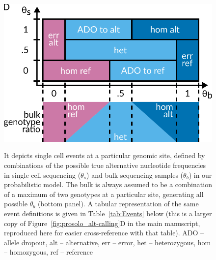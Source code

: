 \documentclass[authoryear,preprint,11pt]{scrartcl}
\begin{document}
\begin{figure}[tbp]
 \includegraphics[width=.7\linewidth]{figs/Event_space.pdf}\\
 \caption{
  It depicts single cell events at a particular genomic site, defined by combinations of the possible true alternative nucleotide frequencies in single cell sequencing ($\theta_s$) and bulk sequencing samples ($\theta_b$) in our probabilistic model.
  The bulk is always assumed to be a combination of a maximum of two genotypes at a particular site, generating all possible $\theta_b$ (bottom panel).
  A tabular representation of the same event definitions is given in Table~\ref{tab:Events} below (this is a larger copy of Figure~\ref{fig:prosolo_alt-calling}D in the main manuscript, reproduced  here for easier cross-reference with that table).\footnotesize\newline
  ADO -- allele dropout, alt -- alternative, err -- error, het -- heterozygous, hom -- homozygous, ref -- reference
  }
 \label{fig:event-space}
\end{figure}
\end{document}
